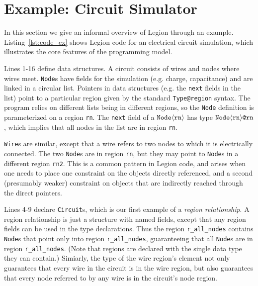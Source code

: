 \section{Example: Circuit Simulator}
\label{sec:ex}

%

In this section we give an informal overview of Legion through an example.
Listing~\ref{lst:code_ex} shows Legion code for an electrical
circuit simulation, which illustrates the core features of the programming model.


Lines 1-16 define data structures.  A circuit consists of wires and
nodes where wires meet.  {\tt Node}s have fields for the simulation
(e.g. charge, capacitance) and are linked in a circular list.
Pointers in data structures (e.g. the {\tt next} fields in the list)
point to a particular region given by the standard {\tt Type@region}
syntax.  The program relies on different lists being in different
regions, so the {\tt Node} definition is parameterized on a region
{\tt rn}.  The {\tt next} field of a $\tt Node \langle rn \rangle$ has
type $\tt Node \langle rn \rangle \mbox{\tt @} rn$, which implies that
all nodes in the list are in region {\tt rn}.

{\tt Wire}s are similar, except that a wire refers to two nodes to
which it is electrically connected.  The two {\tt Node}s are in region {\tt rn},
but they may point to {\tt Node}s in a different region {\tt rn2}.  This is a common pattern in Legion code, and
arises when one needs to place one constraint on the objects directly
referenced, and a second (presumably weaker) constraint on objects
that are indirectly reached through the direct pointers.

Lines 4-9 declare {\tt Circuit}s, which is our first example of a
\emph{region relationship}.  A region relationship is just a structure
with named fields, except that any region fields can be used in the
type declarations.  Thus the region {\tt r\_all\_nodes} contains {\tt
Node}s that point only into region {\tt r\_all\_nodes}, guaranteeing that
all {\tt Node}s are in region {\tt r\_all\_nodes}.  (Note that regions are
declared with the single data type they can contain.)  Simiarly, the
type of the wire region's element not only guarantees that every wire
in the circuit is in the wire region, but also guarantees that every
node referred to by any wire is in the circuit's node region.

